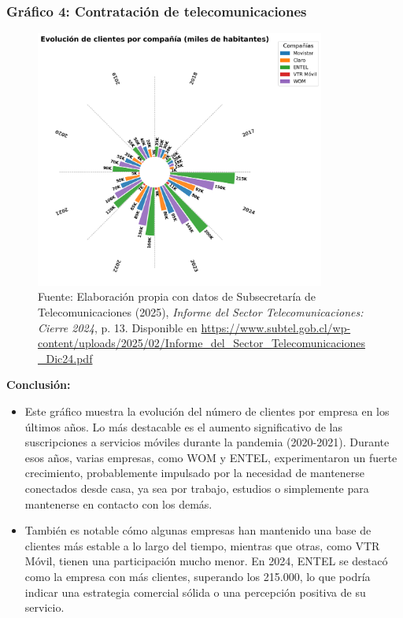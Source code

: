 \documentclass[12pt, a4paper]{article}
\begin{document}
\subsubsection*{Gráfico 4: Contratación de telecomunicaciones}
\begin{figure}[H]
    \centering
    \includegraphics[width=0.85\textwidth]{images/graph2_JG.png}
    \caption{
        Fuente: Elaboración propia con datos de Subsecretaría de Telecomunicaciones (2025), 
        \textit{Informe del Sector Telecomunicaciones: Cierre 2024}, p. 13. 
        Disponible en \url{https://www.subtel.gob.cl/wp-content/uploads/2025/02/Informe_del_Sector_Telecomunicaciones_Dic24.pdf}
    }

\end{figure}


\textbf{Conclusión:}  
\begin{itemize}
    \item Este gráfico muestra la evolución del número de clientes por empresa en los últimos años. Lo más destacable es el aumento significativo de las suscripciones a servicios móviles durante la pandemia (2020-2021). Durante esos años, varias empresas, como WOM y ENTEL, experimentaron un fuerte crecimiento, probablemente impulsado por la necesidad de mantenerse conectados desde casa, ya sea por trabajo, estudios o simplemente para mantenerse en contacto con los demás.
    \item También es notable cómo algunas empresas han mantenido una base de clientes más estable a lo largo del tiempo, mientras que otras, como VTR Móvil, tienen una participación mucho menor. En 2024, ENTEL se destacó como la empresa con más clientes, superando los 215.000, lo que podría indicar una estrategia comercial sólida o una percepción positiva de su servicio.

\end{itemize}



\end{document}
